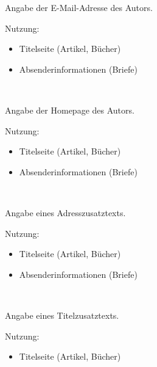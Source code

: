 \DescribeMacro{\email}
Angabe der E-Mail-Adresse des Autors.

Nutzung:
\begin{itemize}
	\item Titelseite (Artikel, Bücher)
	\item Absenderinformationen (Briefe)
\end{itemize}

\begin{nutzung}
		\>\\
	\beispiel
		\>
\end{nutzung}

\DescribeMacro{\homepage}
Angabe der Homepage des Autors.

Nutzung:
\begin{itemize}
	\item Titelseite (Artikel, Bücher)
	\item Absenderinformationen (Briefe)
\end{itemize}

\begin{nutzung}
		\>\\
	\beispiel
		\>
\end{nutzung}

\DescribeMacro{\adresszusatz}
Angabe eines Adresszusatztexts.

Nutzung:
\begin{itemize}
	\item Titelseite (Artikel, Bücher)
	\item Absenderinformationen (Briefe)
\end{itemize}

\begin{nutzung}
		\>\\
	\beispiel
		\>
\end{nutzung}

\DescribeMacro{\titelzusatz}
Angabe eines Titelzusatztexts.

Nutzung:
\begin{itemize}
	\item Titelseite (Artikel, Bücher)
\end{itemize}

\begin{nutzung}
		\>\\
	\beispiel
		\>
\end{nutzung}

